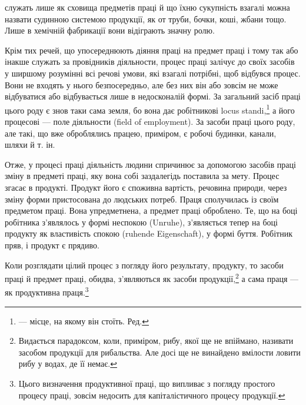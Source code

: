 \parcont{}  %
служать лише як сховища предметів праці й що їхню сукупність
взагалі можна назвати судинною системою продукції, як от
труби, бочки, коші, жбани тощо. Лише в хемічній фабрикації
вони відіграють значну ролю.

Крім тих речей, що упосереднюють діяння праці на предмет
праці і тому так або інакше служать за провідників діяльности,
процес праці залічує до своїх засобів у ширшому розумінні всі
речові умови, які взагалі потрібні, щоб відбувся процес. Вони
не входять у нього безпосередньо, але без них він або зовсім
не може відбуватися або відбувається лише в недосконалій формі.
За загальний засіб праці цього роду є знов таки сама земля, бо
вона дає робітникові locus standi,\footnote*{
— місце, на якому він стоїть. Ред.
} а його процесові — поле
діяльности (field of employment). За засоби праці цього роду,
але такі, що вже оброблялись працею, приміром, є робочі будинки,
канали, шляхи й т. ін.

Отже, у процесі праці діяльність людини спричинює за допомогою
засобів праці зміну в предметі праці, яку вона собі заздалегідь
поставила за мету. Процес згасає в продукті. Продукт його є
споживна вартість, речовина природи, через зміну форми пристосована
до людських потреб. Праця сполучилась із своїм предметом
праці. Вона упредметнена, а предмет праці оброблено. Те, що
на боці робітника з’являлось у формі неспокою (Unruhe), з’являється
тепер на боці продукту як властивість спокою (ruhende
Eigenschaft), у формі буття. Робітник пряв, і продукт є прядиво.

Коли розглядати цілий процес з погляду його результату,
продукту, то засоби праці й предмет праці, обидва, з’являються
як засоби продукції,\footnote{
Видається парадоксом, коли, приміром, рибу, якої ще не впіймано,
називати засобом продукції для рибальства. Але досі ще не винайдено
вмілости ловити рибу у водах, де її немає.
} а сама праця — як продуктивна праця.\footnote{
Цього визначення продуктивної праці, що випливає з погляду простого
процесу праці, зовсім недосить для капіталістичного процесу продукції.
}

